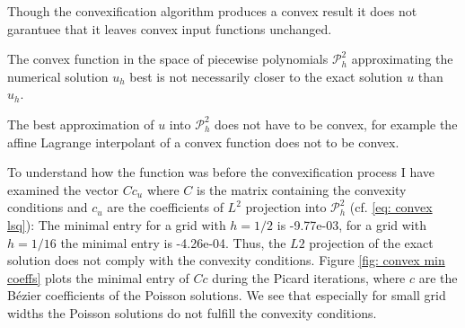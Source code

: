 Though the convexification algorithm produces a convex result it does not garantuee that it leaves convex input functions unchanged.

The convex function in the space of piecewise polynomials $\mathcal P^2_h$ approximating the numerical solution $u_h$ best is not necessarily closer to the exact solution $u$ than $u_h$. %

The best approximation of $u$ into $\mathcal P^2_h$ does not have to be convex, for example the affine Lagrange interpolant of a convex function does not to be convex\cite[p.3142]{AM2009}. 

To understand how  the function was before the convexification process I have examined the vector $Cc_u$ where $C$ is the matrix containing the convexity conditions and $c_u$ are the coefficients of $L^2$ projection into $\mathcal P^2_h$ (cf. \eqref{eq: convex lsq}): The minimal entry for a grid with $h=1/2$ is -9.77e-03, for a grid with $h=1/16$ the minimal entry is -4.26e-04. Thus, the $L2$ projection of the exact solution does not comply with the convexity conditions.
Figure \ref{fig: convex min coeffs} plots the minimal entry of $Cc$ during the Picard iterations, where $c$ are the B\'ezier coefficients of the Poisson solutions. We see that especially for small grid widths the Poisson solutions do not fulfill the convexity conditions. 

